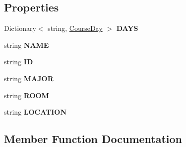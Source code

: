 \subsection*{Properties}
\begin{DoxyCompactItemize}
\item 
Dictionary$<$ string, \hyperlink{class_w_c_c_mobile_1_1_course_1_1_course_day}{Course\+Day} $>$ {\bfseries D\+A\+YS}\hypertarget{class_w_c_c_mobile_1_1_course_a0b736dbe60746050d435704088ab3914}{}\label{class_w_c_c_mobile_1_1_course_a0b736dbe60746050d435704088ab3914}

\item 
string {\bfseries N\+A\+ME}\hypertarget{class_w_c_c_mobile_1_1_course_a7d12dcc3a47c585599892ad4b2eed595}{}\label{class_w_c_c_mobile_1_1_course_a7d12dcc3a47c585599892ad4b2eed595}

\item 
string {\bfseries ID}\hypertarget{class_w_c_c_mobile_1_1_course_a21f59d011e2950134d5abcd1e0ecb9a1}{}\label{class_w_c_c_mobile_1_1_course_a21f59d011e2950134d5abcd1e0ecb9a1}

\item 
string {\bfseries M\+A\+J\+OR}\hypertarget{class_w_c_c_mobile_1_1_course_afdbfb29ceceb19bd469851694b59865e}{}\label{class_w_c_c_mobile_1_1_course_afdbfb29ceceb19bd469851694b59865e}

\item 
string {\bfseries R\+O\+OM}\hypertarget{class_w_c_c_mobile_1_1_course_ac53f8ba4a6c62925d4d33c4d5a8332ce}{}\label{class_w_c_c_mobile_1_1_course_ac53f8ba4a6c62925d4d33c4d5a8332ce}

\item 
string {\bfseries L\+O\+C\+A\+T\+I\+ON}\hypertarget{class_w_c_c_mobile_1_1_course_a5ef33cbe1ce649ff7b7bc43fecd8c6d9}{}\label{class_w_c_c_mobile_1_1_course_a5ef33cbe1ce649ff7b7bc43fecd8c6d9}

\end{DoxyCompactItemize}


\subsection{Member Function Documentation}
